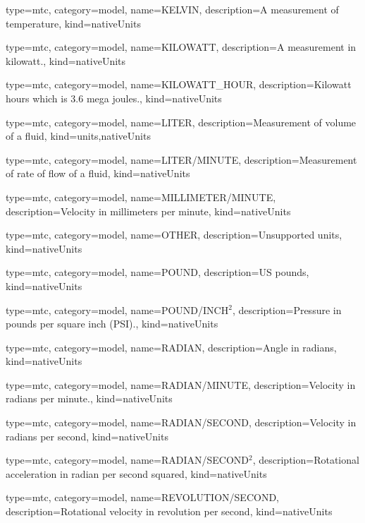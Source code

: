 {
  type=mtc,
  category=model,
  name={KELVIN},
  description={A measurement of temperature},
  kind={nativeUnits}
}


{
  type=mtc,
  category=model,
  name={KILOWATT},
  description={A measurement in kilowatt.},
  kind={nativeUnits}
}


{
  type=mtc,
  category=model,
  name={KILOWATT\_HOUR},
  description={Kilowatt hours which is 3.6 mega joules.},
  kind={nativeUnits}
}


{
  type=mtc,
  category=model,
  name={LITER},
  description={Measurement of volume of a fluid},
  kind={units,nativeUnits}
}


{
  type=mtc,
  category=model,
  name={LITER/MINUTE},
  description={Measurement of rate of flow of a fluid},
  kind={nativeUnits}
}


{
  type=mtc,
  category=model,
  name={MILLIMETER/MINUTE},
  description={Velocity in millimeters per minute},
  kind={nativeUnits}
}


{
  type=mtc,
  category=model,
  name={OTHER},
  description={Unsupported units},
  kind={nativeUnits}
}


{
  type=mtc,
  category=model,
  name={POUND},
  description={US pounds},
  kind={nativeUnits}
}


{
  type=mtc,
  category=model,
  name={POUND/INCH$^2$},
  description={Pressure in pounds per square inch (PSI).},
  kind={nativeUnits}
}


{
  type=mtc,
  category=model,
  name={RADIAN},
  description={Angle in radians},
  kind={nativeUnits}
}


{
  type=mtc,
  category=model,
  name={RADIAN/MINUTE},
  description={Velocity in radians per minute.},
  kind={nativeUnits}
}


{
  type=mtc,
  category=model,
  name={RADIAN/SECOND},
  description={Velocity in radians per second},
  kind={nativeUnits}
}


{
  type=mtc,
  category=model,
  name={RADIAN/SECOND$^2$},
  description={Rotational acceleration in radian per second squared},
  kind={nativeUnits}
}


{
  type=mtc,
  category=model,
  name={REVOLUTION/SECOND},
  description={Rotational velocity in revolution per second},
  kind={nativeUnits}
}


